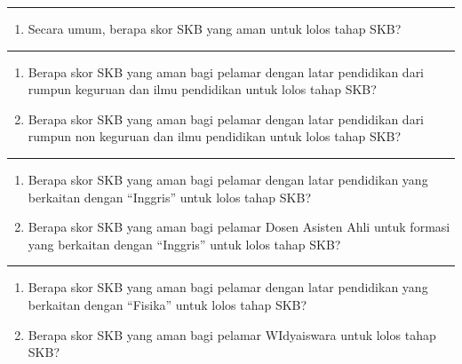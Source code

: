 \documentclass[
]{article}
\providecommand{\tightlist}{%
  \setlength{\itemsep}{0pt}\setlength{\parskip}{0pt}}
\begin{document}
\begin{center}\rule{0.5\linewidth}{0.5pt}\end{center}

\begin{enumerate}
\def\labelenumi{\arabic{enumi}.}
\setcounter{enumi}{7}
\tightlist
\item
  Secara umum, berapa skor SKB yang aman untuk lolos tahap SKB?
\end{enumerate}

\begin{center}\rule{0.5\linewidth}{0.5pt}\end{center}

\begin{enumerate}
\def\labelenumi{\arabic{enumi}.}
\setcounter{enumi}{8}
\tightlist
\item
  Berapa skor SKB yang aman bagi pelamar dengan latar pendidikan dari
  rumpun keguruan dan ilmu pendidikan untuk lolos tahap SKB?
\item
  Berapa skor SKB yang aman bagi pelamar dengan latar pendidikan dari
  rumpun non keguruan dan ilmu pendidikan untuk lolos tahap SKB?
\end{enumerate}

\begin{center}\rule{0.5\linewidth}{0.5pt}\end{center}

\begin{enumerate}
\def\labelenumi{\arabic{enumi}.}
\setcounter{enumi}{10}
\tightlist
\item
  Berapa skor SKB yang aman bagi pelamar dengan latar pendidikan yang
  berkaitan dengan ``Inggris'' untuk lolos tahap SKB?
\item
  Berapa skor SKB yang aman bagi pelamar Dosen Asisten Ahli untuk
  formasi yang berkaitan dengan ``Inggris'' untuk lolos tahap SKB?
\end{enumerate}

\begin{center}\rule{0.5\linewidth}{0.5pt}\end{center}

\begin{enumerate}
\def\labelenumi{\arabic{enumi}.}
\setcounter{enumi}{12}
\tightlist
\item
  Berapa skor SKB yang aman bagi pelamar dengan latar pendidikan yang
  berkaitan dengan ``Fisika'' untuk lolos tahap SKB?
\item
  Berapa skor SKB yang aman bagi pelamar WIdyaiswara untuk lolos tahap
  SKB?
\end{enumerate}
\end{document}
